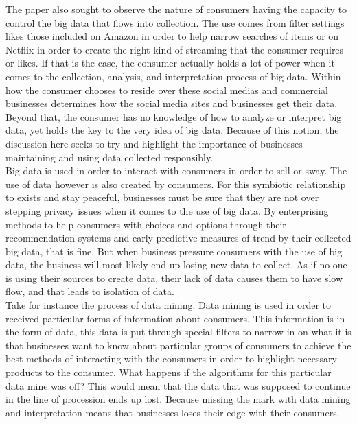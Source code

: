 \documentclass[sigconf]{acmart}
\begin{document}
The paper also sought to observe the nature of consumers having the capacity to control the big data that flows into collection. The use comes from filter settings likes those included on Amazon in order to help narrow searches of items or on Netflix in order to create the right kind of streaming that the consumer requires or likes. If that is the case, the consumer actually holds a lot of power when it comes to the collection, analysis, and interpretation process of big data. Within how the consumer chooses to reside over these social medias and commercial businesses determines how the social media sites and businesses get their data. Beyond that, the consumer has no knowledge of how to analyze or interpret big data, yet holds the key to the very idea of big data. Because of this notion, the discussion here seeks to try and highlight the importance of businesses maintaining and using data collected responsibly. \\

Big data is used in order to interact with consumers in order to sell or sway. The use of data however is also created by consumers. For this symbiotic relationship to exists and stay peaceful, businesses must be sure that they are not over stepping privacy issues when it comes to the use of big data. By enterprising methods to help consumers with choices and options through their recommendation systems and early predictive measures of trend by their collected big data, that is fine. But when business pressure consumers with the use of big data, the business will most likely end up losing new data to collect. As if no one is using their sources to create data, their lack of data causes them to have slow flow, and that leads to isolation of data.\\ 

Take for instance the process of data mining. Data mining is used in order to received particular forms of information about consumers. This information is in the form of data, this data is put through special filters to narrow in on what it is that businesses want to know about particular groups of consumers to achieve the best methods of interacting with the consumers in order to highlight necessary products to the consumer. What happens if the algorithms for this particular data mine was off? This would mean that the data that was supposed to continue in the line of procession ends up lost. Because missing the mark with data mining and interpretation means that businesses loses their edge with their consumers. \\
\end{document}
